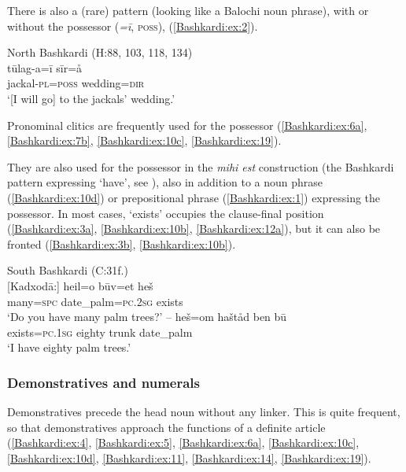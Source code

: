 \documentclass[output=paper,colorlinks,citecolor=brown]{langscibook}
\begin{document}
There is also a (rare)  pattern (looking like a Balochi noun phrase), with or without the possessor  (\textit{=ī}, \textsc{poss}), (\ref{Bashkardi:ex:2}). 

\ea\label{Bashkardi:ex:2}
North Bashkardi (H:88, 103, 118, 134) \\
\gll tūlag-a=ī sīr=å \\ 
jackal\textsc{-pl}\textsc{=poss} wedding\textsc{=dir} \\ 
\glt `[I will go] to the jackals' wedding.'
\z

Pronominal clitics are frequently used for the possessor (\ref{Bashkardi:ex:6a}, \ref{Bashkardi:ex:7b}, \ref{Bashkardi:ex:10c}, \ref{Bashkardi:ex:19}). 

They are also used for the possessor in the \textit{mihi est} construction (the Bashkardi pattern expressing `have', see ), also in addition to a noun phrase (\ref{Bashkardi:ex:10d}) or prepositional phrase (\ref{Bashkardi:ex:1}) expressing the possessor. In most cases, `exists' occupies the clause-final position (\ref{Bashkardi:ex:3a}, \ref{Bashkardi:ex:10b}, \ref{Bashkardi:ex:12a}), but it can also be fronted (\ref{Bashkardi:ex:3b}, \ref{Bashkardi:ex:10b}).


\ea\label{Bashkardi:ex:3}
South Bashkardi (C:31f.) \\
\ea\label{Bashkardi:ex:3a}
\gll \textup{[Kadxodā:]} heil=o būv=et heš \\
{} many\textsc{=spc} date\_palm\textsc{=pc\textsc{.2sg}} exists \\
\glt `Do you have many palm trees?' --
\ex\label{Bashkardi:ex:3b}
\gll heš=om haštåd ben bū \\
exists\textsc{=pc.1sg} eighty trunk\textup{\footnotemark} date\_palm \\
\glt `I have eighty palm trees.'
\z
\z{}

\subsubsection{Demonstratives and numerals}\label{Bashkardi:ss:2.1.2}

{Demonstratives} precede the head noun without any linker. This is quite frequent, so that demonstratives approach the functions of a definite article (\ref{Bashkardi:ex:4}, \ref{Bashkardi:ex:5}, \ref{Bashkardi:ex:6a}, \ref{Bashkardi:ex:10c}, \ref{Bashkardi:ex:10d}, \ref{Bashkardi:ex:11}, \ref{Bashkardi:ex:14}, \ref{Bashkardi:ex:19}).
\end{document}
